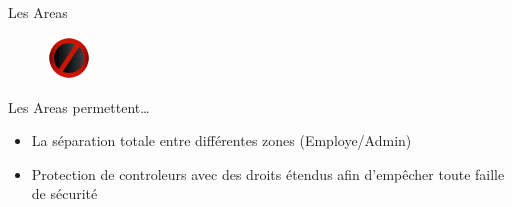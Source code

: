\begin{frame}{Les Areas}
\begin{figure}[h!]
  \includegraphics[width=0.10\textwidth]{images/no__not__stop__wrong-512}
\end{figure}
  Les Areas permettent\dots
  \begin{itemize}
  \item La séparation totale entre différentes zones (Employe/Admin)
  \item Protection de controleurs avec des droits étendus afin d'empêcher toute faille de sécurité
  \end{itemize}
\end{frame}